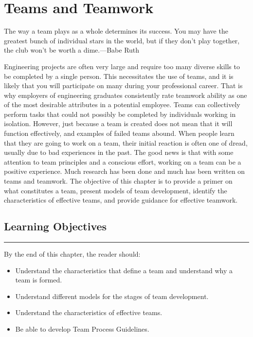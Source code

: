 \chapter{Teams and Teamwork}
\label{chapter:teamsTeamwork}
\graphicspath{ {./chapter09/Fig} }

\begin{itquote}
The way a team plays as a whole determines its success. You may have the
greatest bunch of individual stars in the world, but if they don't play
together, the club won't be worth a dime.---Babe Ruth
\end{itquote}

Engineering projects are often very large and require too many diverse
skills to be completed by a single person. This necessitates the use of
teams, and it is likely that you will participate on many during your
professional career. That is why employers of engineering graduates
consistently rate teamwork ability as one of the most desirable
attributes in a potential employee. Teams can collectively perform tasks
that could not possibly be completed by individuals working in
isolation. However, just because a team is created does not mean that it
will function effectively, and examples of failed teams abound. When
people learn that they are going to work on a team, their initial
reaction is often one of dread, usually due to bad experiences in the
past. The good news is that with some attention to team principles and a
conscious effort, working on a team can be a positive experience. Much
research has been done and much has been written on teams and teamwork.
The objective of this chapter is to provide a primer on what constitutes
a team, present models of team development, identify the characteristics
of effective teams, and provide guidance for effective teamwork.

\section*{Learning Objectives}
\noindent\rule{\linewidth}{1pt}
By the end of this chapter, the reader should:

\begin{itemize}
\item
  Understand the characteristics that define a team and understand why a
  team is formed.
\item
  Understand different models for the stages of team development.
\item
  Understand the characteristics of effective teams.
\item
  Be able to develop Team Process Guidelines.
\end{itemize}

